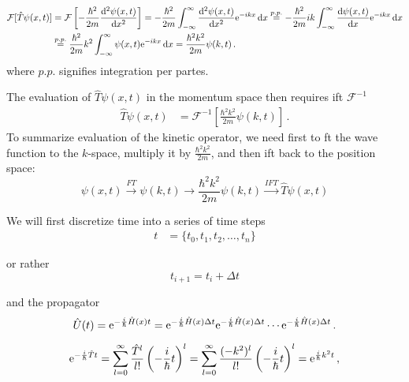 \begin{align}
    \mathcal{F}[\hat{T}\psi(x,t)] &= \mathcal{F}\left[-\frac{\hbar^2}{2m}\frac{\dd^2 \psi(x,t)}{\dd x^2}\right] = -\frac{\hbar^2}{2m} \int_{-\infty}^\infty \frac{\dd^2 \psi(x,t)}{\dd x^2}  \e^{-ikx}\dd x \stackrel{p.p.}{=} -\frac{\hbar^2}{2m} i k \int_{-\infty}^\infty \frac{\dd \psi(x,t)}{\dd x} \e^{-ikx}\dd x \notag \\
    &\stackrel{p.p.}{=} \frac{\hbar^2}{2m} k^2 \int_{-\infty}^\infty \psi(x,t) \e^{-ikx}\dd x = \frac{\hbar^2 k^2}{2m} \psi(k,t) \, .
\end{align}
where $p.p.$ signifies integration per partes. 

The evaluation of $\hat{T}\psi(x,t)$ in the momentum space then requires \acrfull{ift} $\mathcal{F}^{-1}$
\begin{align}
    \hat{T}\psi(x,t) &= \mathcal{F}^{-1}\left[\frac{\hbar^2 k^2}{2m} \psi(k,t)\right] \, .
\end{align}
To summarize evaluation of the kinetic operator, we need first to \acrshort{ft} the wave function to the $k$-space, multiply it by $\frac{\hbar^2 k^2}{2m}$, and then \acrshort{ift} back to the position space:
\begin{equation}
    \psi(x,t) \stackrel{FT}{\longrightarrow} \psi(k,t) \longrightarrow \frac{\hbar^2 k^2}{2m} \psi(k,t) \stackrel{IFT}{\longrightarrow} \hat{T}\psi(x,t)
\end{equation}

We will first discretize time into a series of time steps
\begin{align}
    t &= \{t_0, t_1, t_2, \dots, t_n\} 
\end{align}

or rather
\begin{equation}
    t_{i+1} = t_i +\Delta t
\end{equation}

and the propagator
\begin{equation}
    \hat{U}(t) = \mathrm{e}^{-\frac{i}{\hbar}\hat{H}(x)t} = \mathrm{e}^{-\frac{i}{\hbar}\hat{H}(x)\Delta t} \mathrm{e}^{-\frac{i}{\hbar}\hat{H}(x)\Delta t} \cdots \mathrm{e}^{-\frac{i}{\hbar}\hat{H}(x)\Delta t} \, .
    \label{eq:U4}
\end{equation}


\begin{equation}
    \mathrm{e}^{-\frac{i}{\hbar} \hat{T} t} = \sum_{l=0}^\infty \frac{\hat{T}^l}{l!} \left( -\frac{i}{\hbar} t\right)^l = \sum_{l=0}^\infty \frac{(-k^2)^l}{l!} \left( -\frac{i}{\hbar} t\right)^l =  \mathrm{e}^{\frac{i}{\hbar} k^2 t}\, ,
\end{equation}

